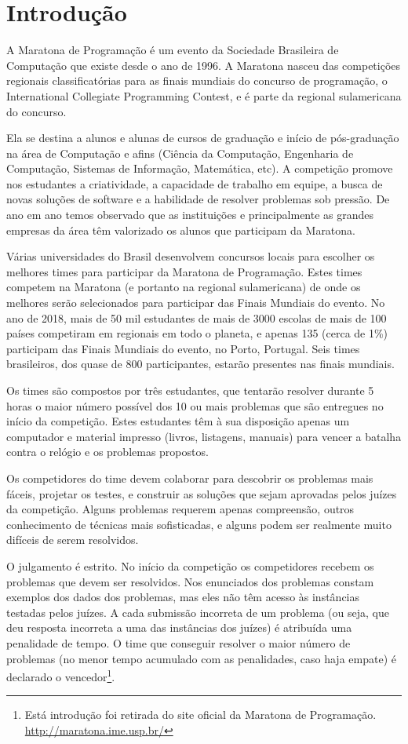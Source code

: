 \newpage

\section{Introdução}
A Maratona de Programação é um evento da Sociedade Brasileira de Computação que existe desde o ano de 1996. A Maratona nasceu das competições regionais classificatórias para as finais mundiais do concurso de programação, o International Collegiate Programming Contest, e é parte da regional sulamericana do concurso.

Ela se destina a alunos e alunas de cursos de graduação e início de pós-graduação na área de Computação e afins (Ciência da Computação, Engenharia de Computação, Sistemas de Informação, Matemática, etc). A competição promove nos estudantes a criatividade, a capacidade de trabalho em equipe, a busca de novas soluções de software e a habilidade de resolver problemas sob pressão. De ano em ano temos observado que as instituições e principalmente as grandes empresas da área têm valorizado os alunos que participam da Maratona.

Várias universidades do Brasil desenvolvem concursos locais para escolher os melhores times para participar da Maratona de Programação. Estes times competem na Maratona (e portanto na regional sulamericana) de onde os melhores serão selecionados para participar das Finais Mundiais do evento. No ano de 2018, mais de 50 mil estudantes de mais de 3000 escolas de mais de 100 países competiram em regionais em todo o planeta, e apenas 135 (cerca de 1\%) participam das Finais Mundiais do evento, no Porto, Portugal. Seis times brasileiros, dos quase de 800 participantes, estarão presentes nas finais mundiais.

Os times são compostos por três estudantes, que tentarão resolver durante 5 horas o maior número possível dos 10 ou mais problemas que são entregues no início da competição. Estes estudantes têm à sua disposição apenas um computador e material impresso (livros, listagens, manuais) para vencer a batalha contra o relógio e os problemas propostos.

Os competidores do time devem colaborar para descobrir os problemas mais fáceis, projetar os testes, e construir as soluções que sejam aprovadas pelos juízes da competição. Alguns problemas requerem apenas compreensão, outros conhecimento de técnicas mais sofisticadas, e alguns podem ser realmente muito difíceis de serem resolvidos.

O julgamento é estrito. No início da competição os competidores recebem os problemas que devem ser resolvidos. Nos enunciados dos problemas constam exemplos dos dados dos problemas, mas eles não têm acesso às instâncias testadas pelos juízes. A cada submissão incorreta de um problema (ou seja, que deu resposta incorreta a uma das instâncias dos juízes) é atribuída uma penalidade de tempo. O time que conseguir resolver o maior número de problemas (no menor tempo acumulado com as penalidades, caso haja empate) é declarado o vencedor\footnote{Está introdução foi retirada do site oficial da Maratona de Programação. \url{http://maratona.ime.usp.br/}}. 

